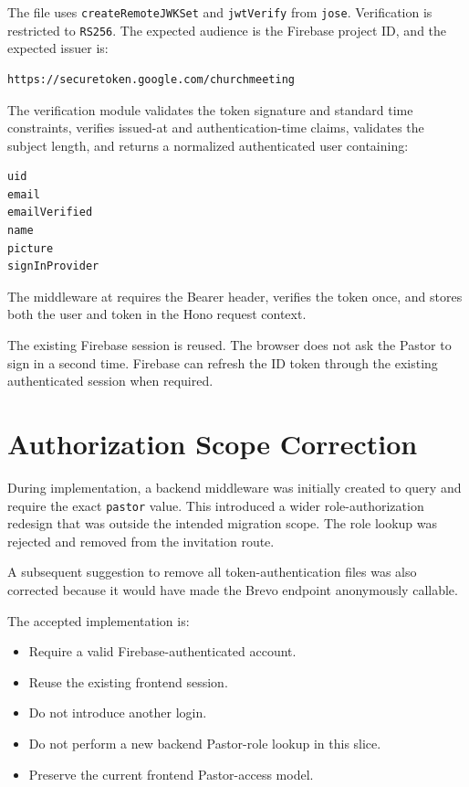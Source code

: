 \documentclass[11pt,a4paper,oneside]{report}
\begin{document}
The file  uses \texttt{createRemoteJWKSet} and \texttt{jwtVerify} from \texttt{jose}. Verification is restricted to \texttt{RS256}. The expected audience is the Firebase project ID, and the expected issuer is:

\begin{lstlisting}
https://securetoken.google.com/churchmeeting
\end{lstlisting}

The verification module validates the token signature and standard time constraints, verifies issued-at and authentication-time claims, validates the subject length, and returns a normalized authenticated user containing:

\begin{lstlisting}
uid
email
emailVerified
name
picture
signInProvider
\end{lstlisting}

The middleware at  requires the Bearer header, verifies the token once, and stores both the user and token in the Hono request context.

The existing Firebase session is reused. The browser does not ask the Pastor to sign in a second time. Firebase can refresh the ID token through the existing authenticated session when required.

\section{Authorization Scope Correction}

During implementation, a backend middleware was initially created to query  and require the exact \texttt{pastor} value. This introduced a wider role-authorization redesign that was outside the intended migration scope. The role lookup was rejected and removed from the invitation route.

A subsequent suggestion to remove all token-authentication files was also corrected because it would have made the Brevo endpoint anonymously callable.

The accepted implementation is:

\begin{itemize}
  \item Require a valid Firebase-authenticated account.
  \item Reuse the existing frontend session.
  \item Do not introduce another login.
  \item Do not perform a new backend Pastor-role lookup in this slice.
  \item Preserve the current frontend Pastor-access model.
\end{itemize}
\end{document}
